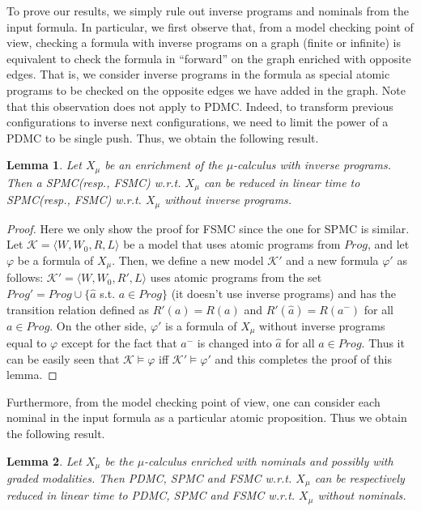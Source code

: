 \documentclass{LMCS}
\theoremstyle{plain}
\def \FSMC          {\textsc{FSMC}\xspace}
\def \K             {\mathcal{K}}
\def \PDMC          {\textsc{PDMC}\xspace}
\def \SPMC          {\textsc{SPMC}\xspace}
\newtheorem{lemma}{Lemma}
\begin{document}
To prove our results, we simply rule out inverse programs and nominals from the
input formula. In particular, we first observe that, from a model checking
point of view, checking a formula with inverse programs on a graph (finite or
infinite) is equivalent to check the formula in ``forward'' on the graph
enriched with opposite edges. That is, we consider inverse programs in the
formula as special atomic programs to be checked on the opposite edges we have
added in the graph. Note that this observation does not apply to \PDMC. Indeed,
to transform previous configurations to inverse next configurations, we need to
limit the power of a \PDMC to be single push. Thus, we obtain the following
result.

\begin{lemma}\label{lem:RemovingInversePrograms}
Let $X_{\mu}$ be an enrichment of the $\mu$-calculus with inverse programs.
Then a \SPMC (resp., \FSMC) w.r.t. $X_{\mu}$ can be reduced in linear time to
\SPMC (resp., \FSMC) w.r.t. $X_{\mu}$ without inverse programs.
\end{lemma}

\begin{proof}
Here we only show the proof for \FSMC since the one for \SPMC is similar. Let
$\K = \langle W, W_0, R, L \rangle$ be a model that uses atomic programs from
$Prog$, and let $\varphi$ be a formula of $X_{\mu}$. Then, we define a new
model $\K'$ and a new formula $\varphi'$ as follows: $\K' = \langle W, W_0, R',
L \rangle$ uses atomic programs from the set $Prog' = Prog \cup \{\hat{a}$ s.t.
$a \in Prog\}$ (it doesn't use inverse programs) and has the transition
relation defined as $R'(a) = R(a)$ and $R'(\hat{a}) = R(a^-)$ for all $a \in
Prog$. On the other side, $\varphi'$ is a formula of $X_{\mu}$ without inverse
programs equal to $\varphi$ except for the fact that $a^-$ is changed into
$\hat{a}$ for all $a \in Prog$. Thus it can be easily seen that $\K \models
\varphi$ iff $\K' \models \varphi'$ and this completes the proof of this lemma.
\end{proof}

Furthermore, from the model checking point of view, one can consider each
nominal in the input formula as a particular atomic proposition. Thus we obtain
the following result.

\begin{lemma}\label{lem:RemovingNominals}
Let $X_{\mu}$ be the $\mu$-calculus enriched with nominals and possibly with
graded modalities. Then \PDMC, \SPMC and \FSMC w.r.t. $X_{\mu}$ can be
respectively reduced in linear time to \PDMC, \SPMC and \FSMC w.r.t. $X_{\mu}$
without nominals.
\end{lemma}
\end{document}
